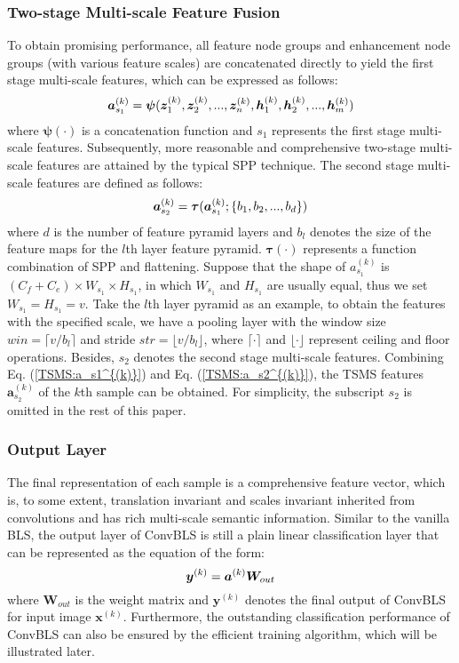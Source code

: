 \documentclass[lettersize,journal]{IEEEtran}
\begin{document}
\subsubsection{Two-stage Multi-scale Feature Fusion}
To obtain promising performance, all feature node groups and enhancement node groups (with various feature scales) are concatenated directly to yield the first stage multi-scale features, which can be expressed as follows:
\begin{equation}
\label{TSMS:a_s1^{(k)}}
    \bm{a}^{(k)}_{s_1} = \bm{\psi} (\bm{z}_1^{(k)},\bm{z}_2^{(k)},...,\bm{z}_n^{(k)}, \bm{h}_1^{(k)},\bm{h}_2^{(k)},...,\bm{h}_m^{(k)})
\end{equation}
where $\bm{\psi}(\cdot)$ is a concatenation function and $s_1$ represents the first stage multi-scale features. Subsequently, more reasonable and comprehensive two-stage multi-scale features are attained by the typical SPP technique. The second stage multi-scale features are defined as follows:
\begin{equation}
    \label{TSMS:a_s2^{(k)}}
    \bm{a}^{(k)}_{s_2}=\bm{\tau}(\bm{a}^{(k)}_{s_1}; \{b_1, b_2, ..., b_d\})
\end{equation}
where $d$ is the number of feature pyramid layers and $b_l$ denotes the size of the feature maps for the $l$th layer feature pyramid. $\bm{\tau}(\cdot)$ represents a function combination of SPP and flattening. Suppose that the shape of $a^{(k)}_{s_1}$ is $(C_f +C_e) \times W_{s_1} \times H_{s_1}$, in which $W_{s_1}$ and $H_{s_1}$ are usually equal, thus we set $W_{s_1} = H_{s_1} = v$. Take the $l$th layer pyramid as an example, to obtain the features with the specified scale, we have a pooling layer with the window size $ win = \lceil v/b_l \rceil $ and stride $str = \lfloor v/b_l \rfloor$, where $\lceil\cdot\rceil$ and $\lfloor\cdot\rfloor$ represent ceiling and floor operations. Besides, $s_2$ denotes the second stage multi-scale features. Combining Eq. (\ref{TSMS:a_s1^{(k)}})
and Eq. (\ref{TSMS:a_s2^{(k)}}), the TSMS features $\bm{a}^{(k)}_{s_2}$ of the $k$th sample can be obtained. For simplicity, the subscript $s_2$ is omitted in the rest of this paper.

\subsubsection{Output Layer}
The final representation of each sample is a comprehensive feature vector, which is, to some extent, translation invariant and scales invariant inherited from convolutions and has rich multi-scale semantic information. Similar to the vanilla BLS, the output layer of ConvBLS is still a plain linear classification layer that can be represented as the equation of the form:
\begin{equation}
    \label{OUTPUT:y^{(k)}}
    \bm{y}^{(k)}=\bm{a}^{(k)}\bm{W}_{out}
\end{equation}
where $\bm{W}_{out}$ is the weight matrix and $\bm{y}^{(k)}$ denotes the final output of ConvBLS for input image $\bm{x}^{(k)}$. Furthermore, the outstanding classification performance of ConvBLS can also be ensured by the efficient training algorithm, which will be illustrated later. 
\end{document}
